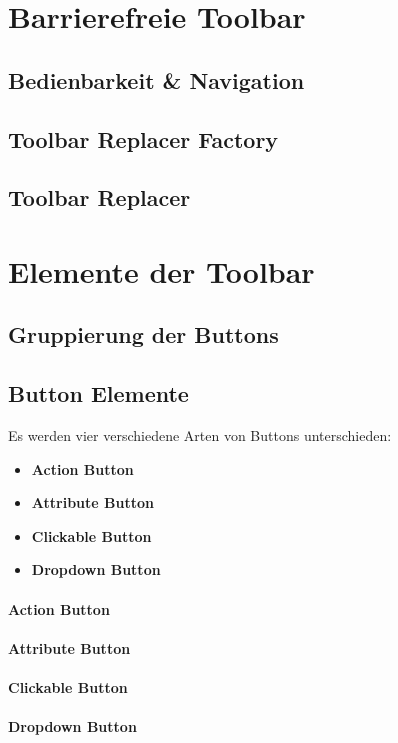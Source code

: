 \section{Barrierefreie Toolbar}
\subsection{Bedienbarkeit \& Navigation}

\subsection{Toolbar Replacer Factory}

\subsection{Toolbar Replacer}

\section{Elemente der Toolbar}
\subsection{Gruppierung der Buttons}

\subsection{Button Elemente}
\label{subsec:buttons}
Es werden vier verschiedene Arten von Buttons unterschieden: 

\begin{itemize}
	\item{\textbf{Action Button}}
	\item{\textbf{Attribute Button}}
	\item{\textbf{Clickable Button}}
	\item{\textbf{Dropdown Button}}
\end{itemize}

\paragraph{Action Button}

\paragraph{Attribute Button}

\paragraph{Clickable Button}

\paragraph{Dropdown Button}
\label{dropdown_button}
